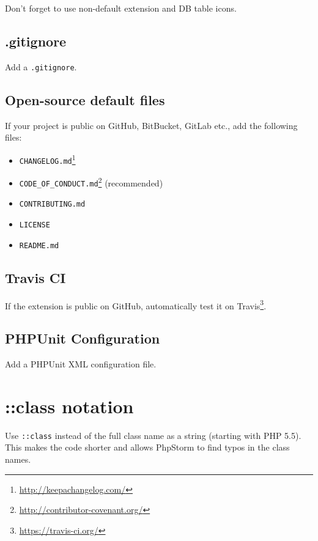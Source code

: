 Don't forget to use non-default extension and DB table icons.

\subsection{.gitignore}

Add a \texttt{.gitignore}.

\subsection{Open-source default files}

If your project is public on GitHub, BitBucket, GitLab etc., add the following files:

\begin{itemize}
  \item \texttt{CHANGELOG.md}\footnote{\url{http://keepachangelog.com/}}
  \item \texttt{CODE\_OF\_CONDUCT.md}\footnote{\url{http://contributor-covenant.org/}} (recommended)
  \item \texttt{CONTRIBUTING.md}
  \item \texttt{LICENSE}
  \item \texttt{README.md}
\end{itemize}

\subsection{Travis CI}

If the extension is public on GitHub, automatically test it on Travis\footnote{\url{https://travis-ci.org/}}.

\subsection{PHPUnit Configuration}

Add a PHPUnit XML configuration file.

\section{::class notation}

Use \texttt{::class} instead of the full class name as a string (starting with PHP 5.5). This makes the code shorter and allows PhpStorm to find typos in the class names.
